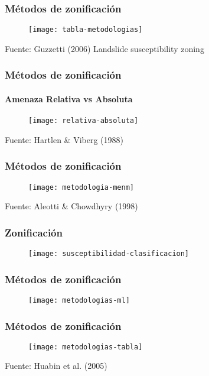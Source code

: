 \documentclass[12pt]{beamer}
\begin{document}
\begin{frame}
\frametitle{Métodos de zonificación}
\begin{figure}
\centering
\texttt{[image: tabla-metodologias]} 
\end{figure}
\tiny{Fuente: Guzzetti (2006) Landslide susceptibility zoning}
\end{frame}
\begin{frame}
\frametitle{Métodos de zonificación}
\framesubtitle{Amenaza Relativa vs Absoluta}
\begin{figure}
\centering
\texttt{[image: relativa-absoluta]} 
\end{figure}
\tiny{Fuente: Hartlen \& Viberg (1988)}
\end{frame}
\begin{frame}
\frametitle{Métodos de zonificación}
\begin{figure}
\centering
\texttt{[image: metodologia-menm]} 
\end{figure}
\tiny{Fuente: Aleotti \& Chowdhyry (1998) }
\end{frame}
\begin{frame}
\frametitle{Zonificación}
\begin{figure}
\centering
\texttt{[image: susceptibilidad-clasificacion]} 
\end{figure}
\end{frame}
\begin{frame}
\frametitle{Métodos de zonificación}
\begin{figure}
\centering
\texttt{[image: metodologias-ml]} 
\end{figure}
\end{frame}
\begin{frame}
\frametitle{Métodos de zonificación}
\begin{figure}
\centering
\texttt{[image: metodologias-tabla]} 
\end{figure}
\tiny{Fuente: Huabin et al. (2005)}
\end{frame}
\end{document}
